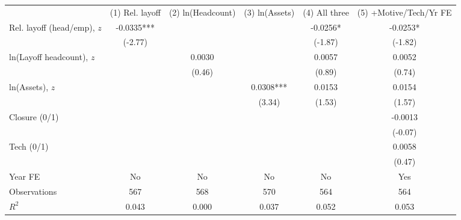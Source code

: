 \begin{tabular}{lccccc}
\toprule
& (1) Rel. layoff & (2) ln(Headcount) & (3) ln(Assets) & (4) All three & (5) +Motive/Tech/Yr FE \\
\cmidrule(lr){2-6}
Rel. layoff (head/emp), $z$ & -0.0335*** &  &  & -0.0256* & -0.0253* \\
 & (-2.77) &  &  & (-1.87) & (-1.82) \\[3pt]
ln(Layoff headcount), $z$ &  & 0.0030 &  & 0.0057 & 0.0052 \\
 &  & (0.46) &  & (0.89) & (0.74) \\[3pt]
ln(Assets), $z$ &  &  & 0.0308*** & 0.0153 & 0.0154 \\
 &  &  & (3.34) & (1.53) & (1.57) \\[3pt]
Closure (0/1) &  &  &  &  & -0.0013 \\
 &  &  &  &  & (-0.07) \\[3pt]
Tech (0/1) &  &  &  &  & 0.0058 \\
 &  &  &  &  & (0.47) \\[3pt]
\midrule
Year FE & No & No & No & No & Yes \\
Observations & 567 & 568 & 570 & 564 & 564 \\
$R^2$ & 0.043 & 0.000 & 0.037 & 0.052 & 0.053 \\
\bottomrule
\end{tabular}